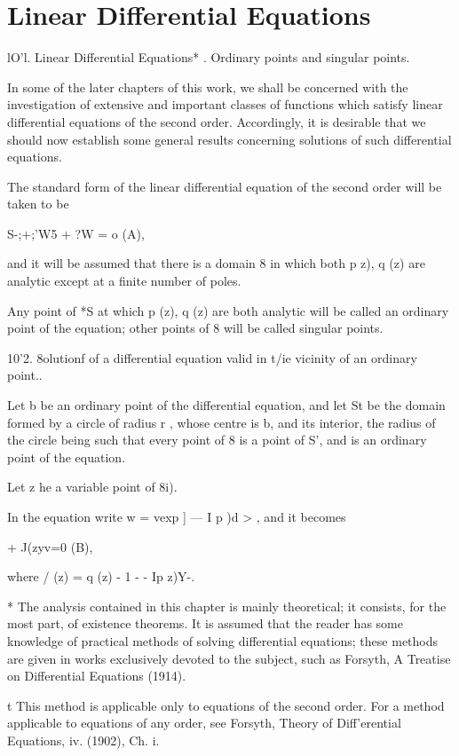 \chapter{Linear Differential Equations} 

lO'l. Linear Differential Equations* . Ordinary points and singular
points.

In some of the later chapters of this work, we shall be concerned with
the investigation of extensive and important classes of functions
which satisfy linear differential equations of the second order.
Accordingly, it is desirable that we should now establish some general
results concerning solutions of such differential equations.

The standard form of the linear differential equation of the second
order will be taken to be

S-;+;'W5 + ?W = o (A),

and it will be assumed that there is a domain 8 in which both p z), q
(z) are analytic except at a finite number of poles.

Any point of *S at which p (z), q (z) are both analytic will be called
an ordinary point of the equation; other points of 8 will be called
singular points.

10'2. 8olutionf of a differential equation valid in t/ie vicinity of
an ordinary point..

Let b be an ordinary point of the differential equation, and let St be
the domain formed by a circle of radius r , whose centre is b, and its
interior, the radius of the circle being such that every point of 8 is
a point of S', and is an ordinary point of the equation.

Let z he a variable point of 8i).

In the equation write w = vexp ] — I p )d > , and it becomes

   + J(zyv=0 (B),

where / (z) = q (z) - 1 - - Ip z)Y-.

* The analysis contained in this chapter is mainly theoretical; it
consists, for the most part, of existence theorems. It is assumed that
the reader has some knowledge of practical methods of solving
differential equations; these methods are given in works exclusively
devoted to the subject, such as Forsyth, A Treatise on Differential
Equations (1914).

t This method is applicable only to equations of the second order. For
a method applicable to equations of any order, see Forsyth, Theory of
Diff'erential Equations, iv. (1902), Ch. i.


